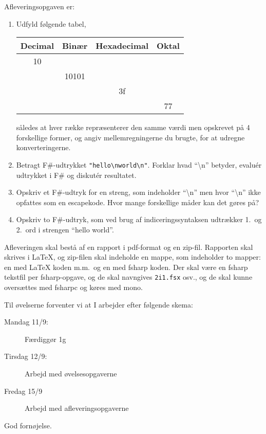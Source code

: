 \documentclass[a4paper,12pt]{article}
\begin{document}
Afleveringsopgaven er:
\begin{enumerate}[label=2i.\arabic*,start=0]
\item Udfyld følgende tabel,
  \begin{center}
    \begin{tabular}{|c|c|c|c|}
      \hline
      Decimal & Binær & Hexadecimal & Oktal\\
      \hline
              10 &  &  & \\
      \hline
              & 10101 &  & \\
      \hline
               &  & 3f  & \\
      \hline
              &  &  & 77 \\
      \hline
    \end{tabular}
  \end{center}
således at hver række repræsenterer den samme værdi men opskrevet på 4 forskellige former, og angiv mellemregningerne du brugte, for at udregne konverteringerne.
\item Betragt F\#-udtrykket \lstinline{"hello\nworld\n"}. Forklar hvad ``\textbackslash n'' betyder, evalu\'{e}r udtrykket i F\# og diskut\'{e}r resultatet.
\item Opskriv et F\#-udtryk for en streng, som indeholder ``\textbackslash n'' men hvor ``\textbackslash n'' ikke opfattes som en escapekode. Hvor mange forskellige måder kan det gøres på?
\item Opskriv to F\#-udtryk, som ved brug af indiceringssyntaksen udtrækker 1.\ og 2.\ ord i strengen ``hello world''.
\end{enumerate}
Afleveringen skal bestå af en rapport i pdf-format og en zip-fil. Rapporten skal skrives i LaTeX, og zip-filen skal indeholde en mappe, som indeholder to mapper: en med LaTeX koden m.m.\ og en med fsharp koden. Der skal være en fsharp tekstfil per fsharp-opgave, og de skal navngives \verb|2i1.fsx| osv., og de skal kunne oversættes med fsharpc og køres med mono.

Til øvelserne forventer vi at I arbejder efter følgende skema:
\begin{description}
\item[Mandag 11/9:] Færdiggør 1g
\item[Tirsdag 12/9:] Arbejd med øvelsesopgaverne
\item[Fredag 15/9]  Arbejd med afleveringsopgaverne
\end{description}


\flushright God fornøjelse.
\end{document}
